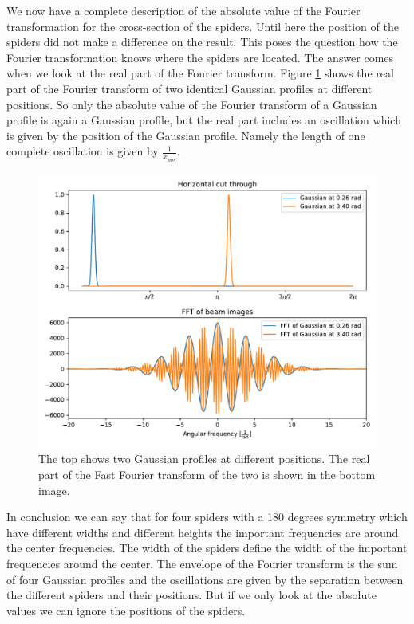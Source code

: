 We now have a complete description of the absolute value of the Fourier transformation for the cross-section of the spiders. Until here the position of the spiders did not make a difference on the result. This poses the question how the Fourier transformation knows where the spiders are located. The answer comes when we look at the real part of the Fourier transform. Figure \ref{fig:Gauss_diffpositions} shows the real part of the Fourier transform of two identical Gaussian profiles at different positions. So only the absolute value of the Fourier transform of a Gaussian profile is again a Gaussian profile, but the real part includes an oscillation which is given by the position of the Gaussian profile. Namely the length of one complete oscillation is given by $\frac{1}{x_{pos}}$.
\begin{figure}[H]
	\centering
		\includegraphics[width=1.0\textwidth]{pics/Gauss_diffpositions.pdf}
		\caption{The top shows two Gaussian profiles at different positions. The real part of the Fast Fourier transform of the two is shown in the bottom image.}
		\label{fig:Gauss_diffpositions}
\end{figure}

In conclusion we can say that for four spiders with a 180 degrees symmetry which have different widths and different heights the important frequencies are around the center frequencies. The width of the spiders define the width of the important frequencies around the center. The envelope of the Fourier transform is the sum of four Gaussian profiles and the oscillations are given by the separation between the different spiders and their positions. But if we only look at the absolute values we can ignore the positions of the spiders.   

